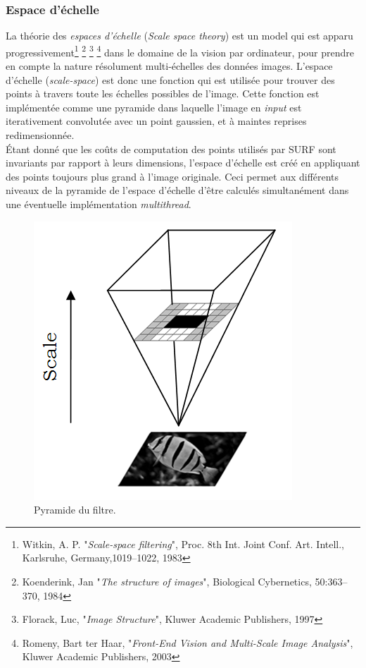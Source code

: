 \documentclass[a4paper,12pt]{report}
\begin{document}
\subsubsection{Espace d'échelle}
La théorie des \textit{espaces d'échelle} (\textit{Scale space theory}) est un model qui est apparu progressivement\footnote{Witkin, A. P. "\textit{Scale-space filtering}", Proc. 8th Int. Joint Conf. Art. Intell., Karlsruhe, Germany,1019–1022, 1983} \footnote{Koenderink, Jan "\textit{The structure of images}", Biological Cybernetics, 50:363–370, 1984} \footnote{Florack, Luc, "\textit{Image Structure}", Kluwer Academic Publishers, 1997} \footnote{Romeny, Bart ter Haar, "\textit{Front-End Vision and Multi-Scale Image Analysis}", Kluwer Academic Publishers, 2003} dans le domaine de la vision par ordinateur, pour prendre en compte la nature résolument multi-échelles des données images. L'espace d'échelle (\textit{scale-space}) est donc une fonction qui est utilisée pour trouver des points à travers toute les échelles possibles de l'image. Cette fonction est implémentée comme une pyramide dans laquelle l'image en \textit{input} est iterativement convolutée avec un point gaussien, et à maintes reprises redimensionnée. 
\\\'Etant donné que les coûts de computation des points utilisés par SURF sont invariants par rapport à leurs dimensions, l'espace d'échelle est créé en appliquant des points toujours plus grand à l'image originale. Ceci permet aux différents niveaux de la pyramide de l'espace d'échelle d'être calculés simultanément dans une éventuelle implémentation \textit{multithread}.
\begin{figure}[ht]
\centering
\includegraphics[scale=0.3]{figure4.png}
\caption{Pyramide du filtre.}
\label{fig4}
\end{figure}
\end{document}
